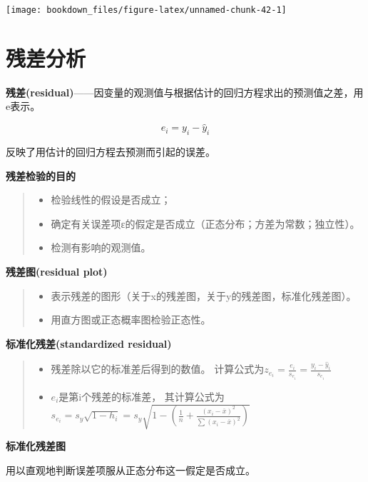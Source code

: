 \documentclass[]{ctexbook}
\providecommand{\tightlist}{%
  \setlength{\itemsep}{0pt}\setlength{\parskip}{0pt}}
\begin{document}
\texttt{[image: bookdown\_files/figure-latex/unnamed-chunk-42-1]}

\hypertarget{ux6b8bux5deeux5206ux6790}{%
\section{残差分析}\label{ux6b8bux5deeux5206ux6790}}

\textbf{残差(residual)}------因变量的观测值与根据估计的回归方程求出的预测值之差，用e表示。

\[e_i=y_i-\hat y_i\]

反映了用估计的回归方程去预测而引起的误差。

\textbf{残差检验的目的}

\begin{quote}
\begin{itemize}
\tightlist
\item
  检验线性的假设是否成立；
\item
  确定有关误差项ε的假定是否成立（正态分布；方差为常数；独立性）。
\item
  检测有影响的观测值。
\end{itemize}
\end{quote}

\textbf{残差图(residual plot)}

\begin{quote}
\begin{itemize}
\tightlist
\item
  表示残差的图形（关于x的残差图，关于y的残差图，标准化残差图）。
\item
  用直方图或正态概率图检验正态性。
\end{itemize}
\end{quote}

\textbf{标准化残差(standardized residual)}

\begin{quote}
\begin{itemize}
\tightlist
\item
  残差除以它的标准差后得到的数值。 计算公式为\(z_{e_i}=\frac{e_i}{s_{e_i}}=\frac{y_i-\hat y_i}{s_{e_i}}\)
\item
  \(e_i\)是第i个残差的标准差， 其计算公式为\(s_{e_i}=s_y\sqrt{1-h_i}=s_y\sqrt{1-(\frac{1}{n}+\frac{(x_i-\bar x)^2}{\sum(x_i-\bar x)^2})}\)
\end{itemize}
\end{quote}

\textbf{标准化残差图}

用以直观地判断误差项服从正态分布这一假定是否成立。
\end{document}
